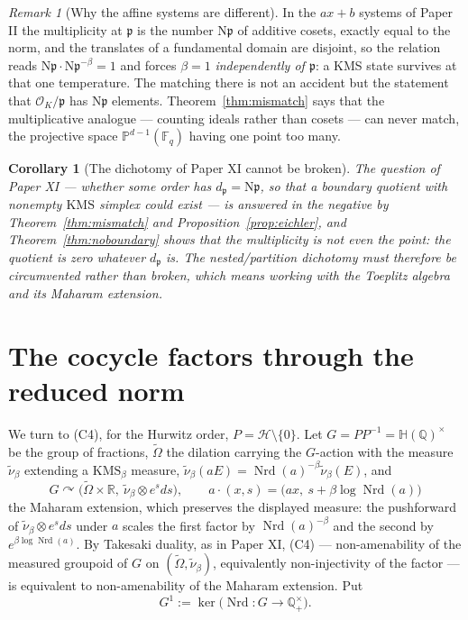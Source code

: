 \documentclass[11pt]{amsart}
\numberwithin{equation}{section}
\newtheorem{corollary}[theorem]{Corollary}
\theoremstyle{definition}
\theoremstyle{remark}
\newtheorem{remark}[theorem]{Remark}
\newcommand{\Q}{\mathbb{Q}}
\newcommand{\R}{\mathbb{R}}
\newcommand{\F}{\mathbb{F}}
\newcommand{\HH}{\mathbb{H}}
\newcommand{\cH}{\mathcal{H}}
\newcommand{\cO}{\mathcal{O}}
\newcommand{\pp}{\mathfrak{p}}
\newcommand{\Ns}{\mathrm{N}}
\newcommand{\Nrd}{\operatorname{Nrd}}
\begin{document}
\begin{remark}[Why the affine systems are different]\label{rem:affine}
In the $ax+b$ systems of Paper II the multiplicity at $\pp$ is the number
$\Ns\pp$ of additive cosets, exactly equal to the norm, and the translates of a fundamental
domain are disjoint, so the relation reads $\Ns\pp\cdot\Ns\pp^{-\beta}=1$ and forces $\beta=1$
\emph{independently of $\pp$}: a KMS state survives at that one temperature. The matching there is not an accident but the statement
that $\cO_K/\pp$ has $\Ns\pp$ elements. Theorem~\ref{thm:mismatch} says that the
multiplicative analogue --- counting ideals rather than cosets --- can never match, the
projective space $\mathbb P^{d-1}(\F_q)$ having one point too many.
\end{remark}

\begin{corollary}[The dichotomy of Paper XI cannot be broken]\label{cor:dichotomy}
The question of Paper XI --- whether some order has $d_\pp=\Ns\pp$, so that a boundary
quotient with nonempty $\mathrm{KMS}$ simplex could exist --- is answered in the negative by
Theorem~\ref{thm:mismatch} and Proposition~\ref{prop:eichler}, and Theorem~\ref{thm:noboundary}
shows that the multiplicity is not even the point: the quotient is zero whatever $d_\pp$ is.
The nested/partition dichotomy must therefore be circumvented rather than broken, which
means working with the Toeplitz algebra and its Maharam extension.
\end{corollary}

\section{The cocycle factors through the reduced norm}

We turn to (C4), for the Hurwitz order, $P=\cH\setminus\{0\}$. Let $G=PP^{-1}=\HH(\Q)^\times$
be the group of fractions, $\widetilde\Omega$ the dilation carrying the $G$-action with the
measure $\tilde\nu_\beta$ extending a $\mathrm{KMS}_\beta$ measure, $\tilde\nu_\beta(aE)=\Nrd(a)^{-\beta}\tilde\nu_\beta(E)$,
and
\[
G\curvearrowright\bigl(\widetilde\Omega\times\R,\ \tilde\nu_\beta\otimes e^{s}ds\bigr),
\qquad
a\cdot(x,s)=\bigl(ax,\ s+\beta\log\Nrd(a)\bigr)
\]
the Maharam extension, which preserves the displayed measure: the pushforward of
$\tilde\nu_\beta\otimes e^sds$ under $a$ scales the first factor by $\Nrd(a)^{-\beta}$ and the
second by $e^{\beta\log\Nrd(a)}$. By Takesaki duality, as in Paper XI, (C4) --- non-amenability
of the measured groupoid of $G$ on $(\widetilde\Omega,\tilde\nu_\beta)$, equivalently
non-injectivity of the factor --- is equivalent to non-amenability of the Maharam extension.
Put
\[
G^1:=\ker\bigl(\Nrd:G\to\Q^\times_+\bigr).
\]
\end{document}
